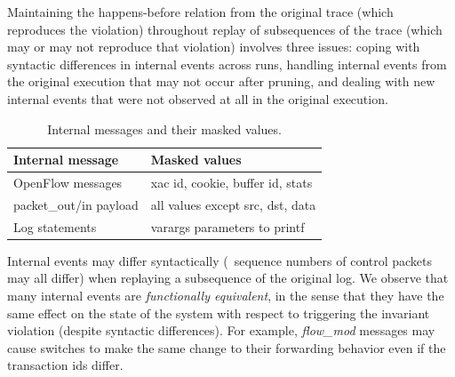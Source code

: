Maintaining the happens-before relation from the original trace
(which reproduces the violation) throughout replay of subsequences of the
trace (which may or may not reproduce that
violation) involves three issues: coping with syntactic differences in internal
events across runs,
handling internal events from the original
execution that may not occur after pruning, and dealing with new internal events that were not
observed at all in the original execution.



\begin{table}[tb]
\centering
\footnotesize
\begin{tabular}{|l|l|}
\hline
{\bf Internal message} & {\bf Masked values} \\
\hline
\hline
OpenFlow messages & xac id, cookie, buffer id, stats \\
\hline
packet\_out/in payload & all values except src, dst, data \\
\hline
Log statements & varargs parameters to printf \\
\hline
\end{tabular}
\caption{Internal messages and their masked values. %
}
\label{tab:fingerprints}
\vspace{-0.5cm}
\end{table}


 Internal events may differ syntactically (\eg~sequence numbers
of control packets may all differ) when replaying a subsequence of the original log.
We observe that many internal events are {\em functionally
equivalent}, in the sense that they
have the same effect on the state of the system with respect to triggering the
invariant violation (despite syntactic differences). For example, \emph{flow\_mod}
messages may cause switches to make the same change to their forwarding behavior
even if the transaction ids differ.

